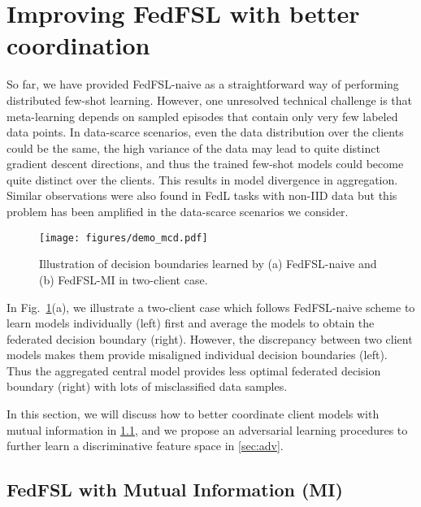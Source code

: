\section{Improving FedFSL with better coordination}

So far, we have provided FedFSL-naive as a straightforward way of performing distributed few-shot learning. However, one unresolved technical challenge is that meta-learning
depends on sampled episodes that contain only very few labeled data points. In data-scarce scenarios, even the data distribution over the clients could be the same, the high variance of the data 
may lead to quite distinct gradient descent directions, and thus
the trained few-shot models could become quite distinct over the clients. This results in model divergence in aggregation.
Similar observations were also found in FedL tasks with non-IID data \cite{zhao2018federated, li2018federated} but this problem has been amplified in the data-scarce scenarios we consider.



\begin{figure}
\begin{center}
\texttt{[image: figures/demo\_mcd.pdf]}
\end{center}
\vspace{-5pt}
\caption{Illustration of decision boundaries learned by (a) FedFSL-naive and (b) FedFSL-MI in two-client case. }
\label{fig:demo_mcd}
\vspace{-10pt}
\end{figure} 


In Fig.~\ref{fig:demo_mcd}(a), we illustrate a two-client case which follows FedFSL-naive scheme to learn models individually (left) first and average the models to obtain the federated decision boundary (right). However, the discrepancy between two client models makes them provide misaligned individual decision boundaries (left). Thus the aggregated central model provides less optimal federated decision boundary (right) with lots of misclassified data samples. 

In this section, we will discuss how to better coordinate client models with mutual information in \ref{sec:fed_maml_mi}, and we propose an adversarial learning procedures to further learn a discriminative feature space in \ref{sec:adv}.



\subsection{FedFSL with Mutual Information (MI)}
\label{sec:fed_maml_mi}


